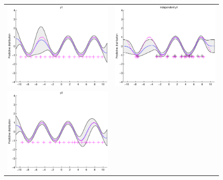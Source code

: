 \begin{figure}
\centering
\begin{tabular}{cc}
\includegraphics[scale=0.5]{figures/ssvi-y1.eps} &
\includegraphics[scale=0.5]{figures/ssvi-svi1.eps} \\
\includegraphics[scale=0.5]{figures/ssvi-y2.eps} &

\end{tabular}
\end{figure}
